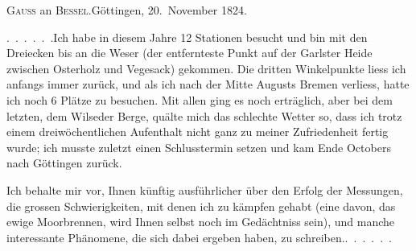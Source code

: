 \begin{center}
\textsc{Gauss} an \textsc{Bessel}.\quad Göttingen, 20.~November 1824.
\end{center}

\par\noindent\hspace*{\parindent}.\ .\ .\ .\ .\ .\quad Ich habe in diesem Jahre 12 Stationen besucht und bin mit den Dreiecken bis an die Weser (der entfernteste Punkt auf der Garlster Heide zwischen Osterholz und Vegesack) gekommen.
Die dritten Winkelpunkte liess ich anfangs immer zurück, und als ich nach der Mitte Augusts Bremen verliess, hatte ich noch 6 Plätze zu besuchen.
Mit allen ging es noch erträglich, aber bei dem letzten, dem Wilseder Berge, quälte mich das schlechte Wetter so, dass ich trotz einem dreiwöchentlichen Aufenthalt nicht ganz zu meiner Zufriedenheit fertig wurde; ich musste zuletzt einen Schlusstermin setzen und kam Ende Octobers nach Göttingen zurück.

\par\noindent\hspace*{\parindent}Ich behalte mir vor, Ihnen künftig ausführlicher über den Erfolg der Messungen, die grossen Schwierigkeiten, mit denen ich zu kämpfen gehabt (eine davon, das ewige Moorbrennen, wird Ihnen selbst noch im Gedächtniss sein), und manche interessante Phänomene, die sich dabei ergeben haben, zu schreiben.\quad.\ .\ .\ .\ .\ .


